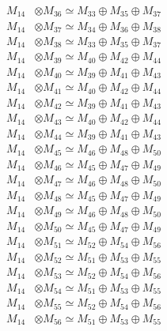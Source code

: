\begin{align*}
M_{14} &\otimes M_{36} \simeq M_{33} \oplus M_{35} \oplus M_{37} \\
M_{14} &\otimes M_{37} \simeq M_{34} \oplus M_{36} \oplus M_{38} \\
M_{14} &\otimes M_{38} \simeq M_{33} \oplus M_{35} \oplus M_{37} \\
M_{14} &\otimes M_{39} \simeq M_{40} \oplus M_{42} \oplus M_{44} \\
M_{14} &\otimes M_{40} \simeq M_{39} \oplus M_{41} \oplus M_{43} \\
M_{14} &\otimes M_{41} \simeq M_{40} \oplus M_{42} \oplus M_{44} \\
M_{14} &\otimes M_{42} \simeq M_{39} \oplus M_{41} \oplus M_{43} \\
M_{14} &\otimes M_{43} \simeq M_{40} \oplus M_{42} \oplus M_{44} \\
M_{14} &\otimes M_{44} \simeq M_{39} \oplus M_{41} \oplus M_{43} \\
M_{14} &\otimes M_{45} \simeq M_{46} \oplus M_{48} \oplus M_{50} \\
M_{14} &\otimes M_{46} \simeq M_{45} \oplus M_{47} \oplus M_{49} \\
M_{14} &\otimes M_{47} \simeq M_{46} \oplus M_{48} \oplus M_{50} \\
M_{14} &\otimes M_{48} \simeq M_{45} \oplus M_{47} \oplus M_{49} \\
M_{14} &\otimes M_{49} \simeq M_{46} \oplus M_{48} \oplus M_{50} \\
M_{14} &\otimes M_{50} \simeq M_{45} \oplus M_{47} \oplus M_{49} \\
M_{14} &\otimes M_{51} \simeq M_{52} \oplus M_{54} \oplus M_{56} \\
M_{14} &\otimes M_{52} \simeq M_{51} \oplus M_{53} \oplus M_{55} \\
M_{14} &\otimes M_{53} \simeq M_{52} \oplus M_{54} \oplus M_{56} \\
M_{14} &\otimes M_{54} \simeq M_{51} \oplus M_{53} \oplus M_{55} \\
M_{14} &\otimes M_{55} \simeq M_{52} \oplus M_{54} \oplus M_{56} \\
M_{14} &\otimes M_{56} \simeq M_{51} \oplus M_{53} \oplus M_{55} \\
\end{align*}

